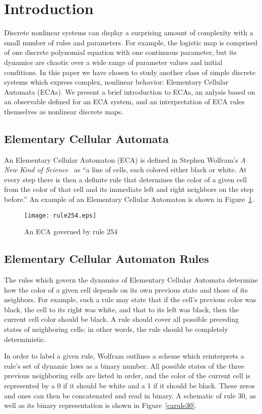 \section{Introduction}
Discrete nonlinear systems can display a surprising amount of
complexity with a small number of rules and parameters.
For example, the logistic map is comprised of one discrete polynomial
equation with one continuous parameter, but its dynamics are chaotic
over a wide range of parameter values and initial conditions.
In this paper we have chosen to study another class of simple discrete
systems which express complex, nonlinear behavior: Elementary Cellular
Automata (ECAs).
We present a brief introduction to ECAs, an anlysis based on an
observable defined for an ECA system, and an interpretation of ECA
rules themselves as nonlinear discrete maps.


\subsection{Elementary Cellular Automata}
An Elementary Cellular Automaton (ECA) is defined in Stephen Wolfram's
\emph{A New Kind of Science}~\cite{anks} as ``a line of cells, each
colored either black or white. At every step there is then a definite
rule that determines the color of a given cell from the color of that
cell and its immediate left and right neighbors on the step before.''
An example of an Elementary Cellular Automaton is shown in
Figure~\ref{rule254}.

\begin{figure}
    \centering
    \texttt{[image: rule254.eps]}
    \caption{\label{rule254} An ECA governed by rule 254}
\end{figure}


\subsection{Elementary Cellular Automaton Rules}
The rules which govern the dynamics of Elementary Cellular Automata
determine how the color of a given cell depends on its own previous
state and those of its neighbors.
For example, such a rule may state that if the cell's previous color
was black, the cell to its right was white, and that to its left was
black, then the current cell color should be black.
A rule should cover all possible preceding states of neighboring
cells; in other words, the rule should be completely deterministic.

In order to label a given rule, Wolfram outlines a scheme which
reinterprets a rule's set of dynamic laws as a binary number.
All possible states of the three previous neighboring cells are listed
in order, and the color of the current cell is represented by a 0 if
it should be white and a 1 if it should be black.
These zeros and ones can then be concatenated and read in binary.
A schematic of rule 30, as well as its binary representation is shown
in Figure~\ref{carule30}.

